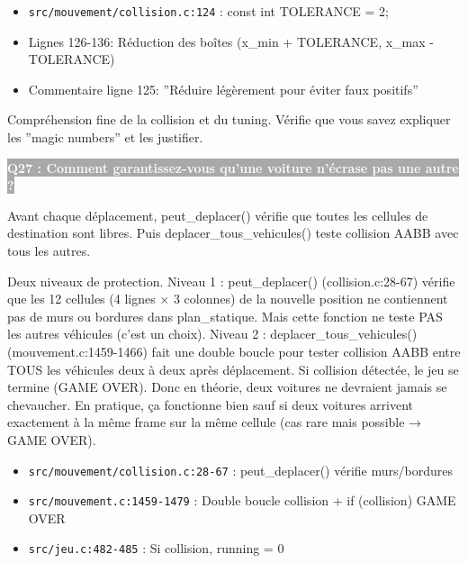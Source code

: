 \documentclass[12pt,a4paper]{article}
\newcommand{\question}[1]{%
    \vspace{0.5cm}
    \noindent\colorbox{darkgray}{\textcolor{white}{\textbf{#1}}}
    \vspace{0.3cm}
}
\begin{document}
\begin{reference_code}
\begin{itemize}
    \item \texttt{src/mouvement/collision.c:124} : const int TOLERANCE = 2;
    \item Lignes 126-136: Réduction des boîtes (x\_min + TOLERANCE, x\_max - TOLERANCE)
    \item Commentaire ligne 125: ''Réduire légèrement pour éviter faux positifs''
\end{itemize}
\end{reference_code}

\begin{objectif_prof}
Compréhension fine de la collision et du tuning. Vérifie que vous savez expliquer les ''magic numbers'' et les justifier.
\end{objectif_prof}

\question{Q27 : Comment garantissez-vous qu'une voiture n'écrase pas une autre ?}

\begin{reponse_courte}
Avant chaque déplacement, peut\_deplacer() vérifie que toutes les cellules de destination sont libres. Puis deplacer\_tous\_vehicules() teste collision AABB avec tous les autres.
\end{reponse_courte}

\begin{reponse_longue}
Deux niveaux de protection. Niveau 1 : peut\_deplacer() (collision.c:28-67) vérifie que les 12 cellules (4 lignes × 3 colonnes) de la nouvelle position ne contiennent pas de murs ou bordures dans plan\_statique. Mais cette fonction ne teste PAS les autres véhicules (c'est un choix). Niveau 2 : deplacer\_tous\_vehicules() (mouvement.c:1459-1466) fait une double boucle pour tester collision AABB entre TOUS les véhicules deux à deux après déplacement. Si collision détectée, le jeu se termine (GAME OVER). Donc en théorie, deux voitures ne devraient jamais se chevaucher. En pratique, ça fonctionne bien sauf si deux voitures arrivent exactement à la même frame sur la même cellule (cas rare mais possible → GAME OVER).
\end{reponse_longue}

\begin{reference_code}
\begin{itemize}
    \item \texttt{src/mouvement/collision.c:28-67} : peut\_deplacer() vérifie murs/bordures
    \item \texttt{src/mouvement.c:1459-1479} : Double boucle collision + if (collision) GAME OVER
    \item \texttt{src/jeu.c:482-485} : Si collision, running = 0
\end{itemize}
\end{reference_code}
\end{document}
